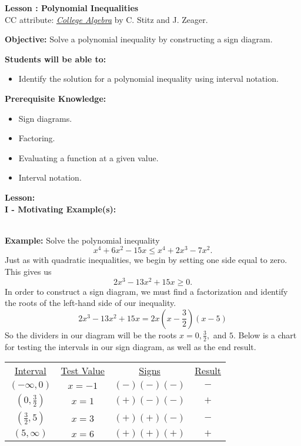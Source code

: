 \documentclass[12pt]{article}
\theoremstyle{definition}
\begin{document}
{\bf \large Lesson : Polynomial Inequalities}
\\ CC attribute: \href{http://www.stitz-zeager.com}{\it{College Algebra}} by C. Stitz and J. Zeager. 
\hfill \doclicenseImage[imagewidth=5em]\\
\par
{\bf Objective:}	Solve a polynomial inequality by constructing a sign diagram.\\
\par
{\bf Students will be able to:}
\begin{itemize}
	\item Identify the solution for a polynomial inequality using interval notation.
\end{itemize}
{\bf Prerequisite Knowledge:}
\begin{itemize}
	\item Sign diagrams.
	\item Factoring.
	\item Evaluating a function at a given value.
	\item Interval notation.
\end{itemize}
\hrulefill

{\bf Lesson:}\\
{\bf I - Motivating Example(s):}\\
\ \par
{\bf Example:}  Solve the polynomial inequality
$$x^4+6x^2-15x\leq x^4+2x^3-7x^2.$$
Just as with quadratic inequalities, we begin by setting one side equal to zero.  This gives us $$2x^3-13x^2+15x\geq 0.$$
In order to construct a sign diagram, we must find a factorization and identify the roots of the left-hand side of our inequality.
$$2x^3-13x^2+15x=2x\left(x-\dfrac{3}{2}\right)(x-5)$$
So the dividers in our diagram will be the roots $x=0,\frac{3}{2},$ and $5$.  Below is a chart for testing the intervals in our sign diagram, as well as the end result.

\begin{center}
\begin{tabular}{cccc}
\underline{Interval} & \underline{Test Value} & \underline{Signs} & \underline{Result}\\
$(-\infty,0)$ & $x=-1$ & $(-)(-)(-)$ & $-$\\
$(0,\frac{3}{2})$ & $x=1$ & $(+)(-)(-)$ & $+$\\
$(\frac{3}{2},5)$ & $x=3$ & $(+)(+)(-)$ & $-$\\
$(5,\infty)$ &  $x=6$ & $(+)(+)(+)$ & $+$
\end{tabular}
\end{center}
\end{document}
